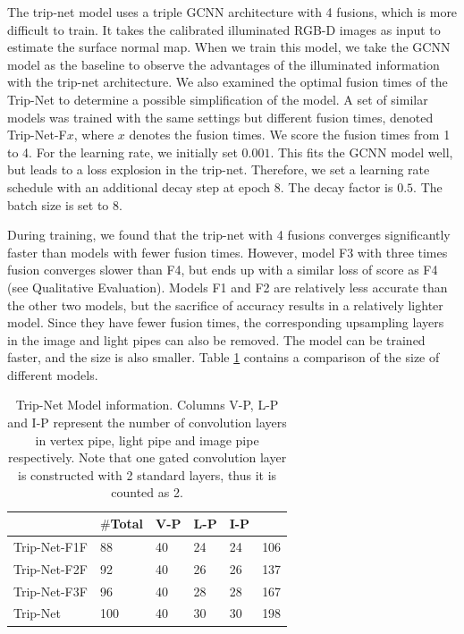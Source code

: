 The trip-net model uses a triple GCNN architecture with 4 fusions, which is more difficult to train. It takes the calibrated illuminated RGB-D images as input to estimate the surface normal map. When we train this model, we take the GCNN model as the baseline to observe the advantages of the illuminated information with the trip-net architecture.
We also examined the optimal fusion times of the Trip-Net to determine a possible simplification of the model. A set of similar models was trained with the same settings but different fusion times, denoted Trip-Net-F$ x $, where $ x $ denotes the fusion times. We score the fusion times from 1 to 4. For the learning rate, we initially set $ 0.001 $. This fits the GCNN model well, but leads to a loss explosion in the trip-net. Therefore, we set a learning rate schedule with an additional decay step at epoch 8. The decay factor is $ 0.5$. The batch size is set to 8.

During training, we found that the trip-net with 4 fusions converges significantly faster than models with fewer fusion times. However, model F3 with three times fusion converges slower than F4, but ends up with a similar loss of score as F4 (see Qualitative Evaluation). Models F1 and F2 are relatively less accurate than the other two models, but the sacrifice of accuracy results in a relatively lighter model. Since they have fewer fusion times, the corresponding upsampling layers in the image and light pipes can also be removed. The model can be trained faster, and the size is also smaller. Table \ref{tab:trip-net-size-compare} contains a comparison of the size of different models.



\begin{table}[H]
	\centering
	\captionsetup{width=\linewidth}
	\begin{tabular}{l | l l l l l }
		\toprule
		\tabhead{Model} & $ \# $\textbf{Total} &\textbf{ V-P} & \textbf{L-P} & \textbf{I-P} & \tabhead{Size /MB}\\
		\midrule
		Trip-Net-F1F  			& 88 &  40 & 24 & 24 & 106\\ 
		\hline
		Trip-Net-F2F 			& 92 & 40 & 26 & 26 & 137 \\ 
		\hline
		Trip-Net-F3F 			& 96 & 40 & 28 & 28 & 167 \\
		\hline
		Trip-Net 				& 100 & 40 & 30 & 30 & 198\\
		\bottomrule
	\end{tabular}
	\caption{Trip-Net Model information. Columns V-P, L-P and I-P represent the number of convolution layers in vertex pipe, light pipe and image pipe respectively. Note that one gated convolution layer is constructed with 2 standard layers, thus it is counted as 2. }	
	\label{tab:trip-net-size-compare}
\end{table}


